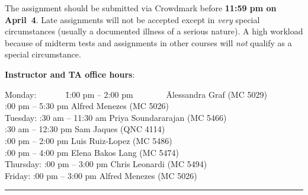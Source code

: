 \documentclass[11pt]{article}
\begin{document}
\vspace*{2mm}
\noindent
The assignment should be submitted via Crowdmark before {\bf 11:59 pm
on April~4}. Late assignments will not be accepted except in
\emph{very} special circumstances (usually a documented illness of
a serious nature). A high workload because of midterm tests and assignments
in other courses will \emph{not} qualify as a special circumstance.

\vspace*{4mm}
\noindent
{\bf Instructor and TA office hours}:
\begin{tabbing}
Monday:~~~~~~~\=1:00 pm -- 2:00 pm~~~~~~~~\= Alessandra Graf (MC 5029)\\
:00 pm -- 5:30 pm \> Alfred Menezes (MC 5026)\\
Tuesday: :30 am -- 11:30 am \> Priya Soundararajan (MC 5466)\\
:30 am -- 12:30 pm \> Sam Jaques (QNC 4114)\\
:00 pm -- 2:00 pm \> Luis Ruiz-Lopez (MC 5486)\\
:00 pm -- 4:00 pm \> Elena Bakos Lang (MC 5474)\\
Thursday: :00 pm -- 3:00 pm \> Chris Leonardi (MC 5494)\\
Friday: :00 pm -- 3:00 pm \> Alfred Menezes (MC 5026)
\end{tabbing}

\hfill\hrule
\end{document}
